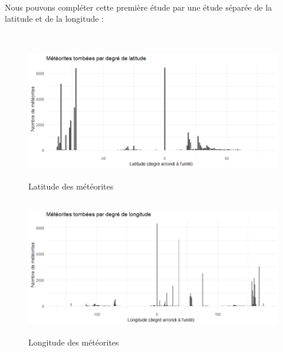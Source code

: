 \documentclass[12pt]{article}
\begin{document}
\\
Nous pouvons compléter cette première étude par une étude séparée de la latitude et de la longitude :\\
\\
\begin{figure}[H]
\centering
\includegraphics[width=16cm,height=6cm]{Images/exploration/histogramme_latitude.png}
\caption{Latitude des météorites}
\end{figure}
\begin{figure}[H]
\centering
\includegraphics[width=16cm,height=6cm]{Images/exploration/histogramme_longitude.png}
\caption{Longitude des météorites}
\end{figure}
\end{document}
